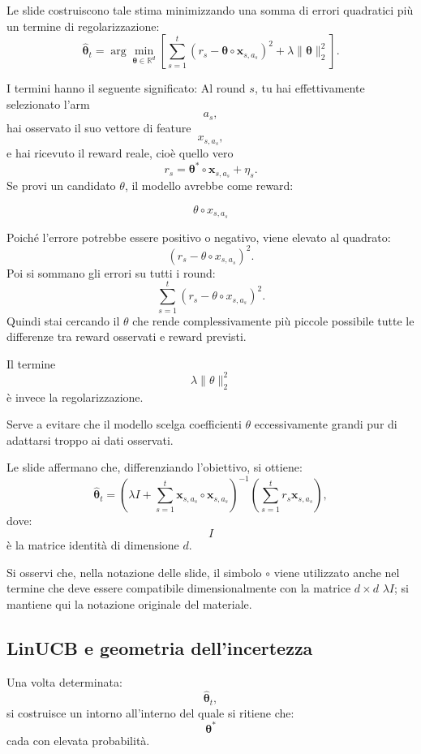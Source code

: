 Le slide costruiscono tale stima minimizzando una somma di errori quadratici più un termine di regolarizzazione:
\[
\widehat{\boldsymbol{\theta}}_t
=
\arg\min_{\boldsymbol{\theta}\in\mathbb{R}^{d}}
\left[
\sum_{s=1}^{t}
\left(
r_s-
\boldsymbol{\theta}
\circ
\mathbf{x}_{s,a_s}
\right)^2
+
\lambda
\|\boldsymbol{\theta}\|_2^2
\right].
\]

I termini hanno il seguente significato:
Al round \(s\), tu hai effettivamente selezionato l'arm
\[
a_s,
\]
hai osservato il suo vettore di feature
\[
x_{s,a_s},
\]
e hai ricevuto il reward reale, cioè quello vero
\[
r_s
=
\boldsymbol{\theta}^*
\circ
\mathbf{x}_{s,a_s}
+
\eta_s.
\]
Se provi un candidato \(\theta\), il modello avrebbe come reward:

\[
\theta\circ x_{s,a_s}
\]

Poiché l'errore potrebbe essere positivo o negativo, viene elevato al quadrato:
\[
\left(r_s-\theta\circ x_{s,a_s}\right)^2.
\]
Poi si sommano gli errori su tutti i round:
\[
\sum_{s=1}^{t}
\left(
r_s-\theta\circ x_{s,a_s}
\right)^2.
\]
Quindi stai cercando il \(\theta\) che rende complessivamente più piccole possibile tutte le differenze tra reward osservati e reward previsti.

Il termine
\[
\lambda\|\theta\|_2^2
\]
è invece la regolarizzazione.

Serve a evitare che il modello scelga coefficienti \(\theta\) eccessivamente grandi pur di adattarsi troppo ai dati osservati.

Le slide affermano che, differenziando l'obiettivo, si ottiene:
\[
\widehat{\boldsymbol{\theta}}_t
=
\left(
\lambda I
+
\sum_{s=1}^{t}
\mathbf{x}_{s,a_s}
\circ
\mathbf{x}_{s,a_s}
\right)^{-1}
\left(
\sum_{s=1}^{t}
r_s\mathbf{x}_{s,a_s}
\right),
\]
dove:
\[
I
\]
è la matrice identità di dimensione $d$.

Si osservi che, nella notazione delle slide, il simbolo $\circ$ viene utilizzato anche nel termine che deve essere compatibile dimensionalmente con la matrice $d\times d$ $\lambda I$; si mantiene qui la notazione originale del materiale.

\subsection{LinUCB e geometria dell'incertezza}

Una volta determinata:
\[
\widehat{\boldsymbol{\theta}}_t,
\]
si costruisce un intorno all'interno del quale si ritiene che:
\[
\boldsymbol{\theta}^{*}
\]
cada con elevata probabilità.


